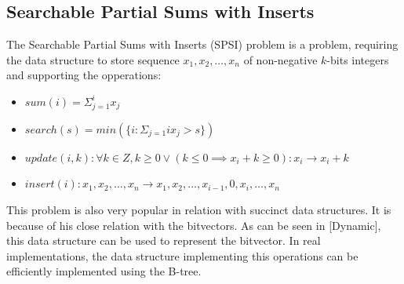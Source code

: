 \subsection{Searchable Partial Sums with Inserts}

\begin{theorem}
The Searchable Partial Sums with Inserts (SPSI) problem is a problem, requiring the data structure to
store sequence $x_1, x_2, \ldots , x_n$ of non-negative $k$-bits integers and supporting the opperations:
\begin{itemize}
    \item $sum(i) = \Sigma_{j=1}^{i} x_j$
    \item $search(s) = min(\{i : \Sigma_{j=1}{i} x_j > s \})$
    \item $update(i, k): \forall k \in Z, k \geq 0 \lor (k\leq 0 \implies x_i + k \geq 0): x_i \rightarrow x_i + k$
    \item $insert(i): x_1, x_2,\ldots, x_n \rightarrow x_1, x_2,\ldots , x_{i-1}, 0, x_{i}, \ldots , x_n$
\end{itemize}
\end{theorem}

This problem is also very popular in relation with succinct data structures. It is because of his close relation with the bitvectors.
As can be seen in [Dynamic], this data structure can be used to represent the bitvector. In real implementations, the data structure
implementing this operations can be efficiently implemented using the B-tree.
